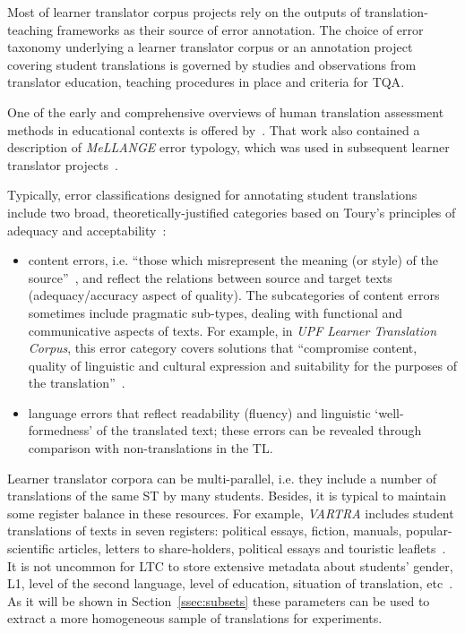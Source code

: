Most of learner translator corpus projects rely on the outputs of translation-teaching frameworks as their
source of error annotation. The choice of error taxonomy underlying a learner translator corpus or an annotation project covering student translations is governed by studies and observations from translator education, teaching procedures in place and criteria for \gls{TQA}. 

One of the early and comprehensive overviews of human translation assessment methods in educational contexts is offered by~\citet{Secara2005}. That work also contained a description of \textit{MeLLANGE} error typology, which was used in subsequent learner translator projects~\cite{Stepankova2014,Fictumova2017,Verplaetse2019}.

Typically, error classifications designed for annotating student translations include two broad, theoretically-justified categories based on Toury's principles of adequacy and acceptability~\cite{Toury1995}: 

\begin{itemize}\compresslist{}
	\item content errors, i.e. ``those which misrepresent the meaning (or style) of the source''~\cite[p.39]{Chesterman2010}, and reflect the relations between source and target texts (adequacy/accuracy aspect of quality). The subcategories of content errors sometimes include pragmatic sub-types, dealing
	with functional and communicative aspects of texts. For example, in \textit{UPF Learner Translation Corpus}, this error category covers solutions that ``compromise content, quality of linguistic and cultural expression and suitability for the purposes of the translation''~\cite[p.36]{Espunya2014}.
	\item language errors that reflect readability (fluency) and linguistic `well-formedness' of the translated text; these errors can be revealed through comparison with non-translations in the TL.
\end{itemize}

Learner translator corpora can be multi-parallel, i.e. they include a number of translations of the same ST by many students. Besides, it is typical to maintain some register balance in these resources. For example, \textit{VARTRA} includes student translations of texts in seven registers: political essays, fiction, manuals, popular-scientific articles, letters to share-holders, political essays and touristic leaflets~\cite{Lapshinova2013}.
It is not uncommon for \gls{LTC} to store extensive metadata about students' gender, \gls{L1}, level of the second language, level of education, situation of translation, etc~\cite[see, for example,]{Bowker2003}. As it will be shown in Section~\ref{ssec:subsets} these parameters can be used to extract a more homogeneous sample of translations for experiments.

